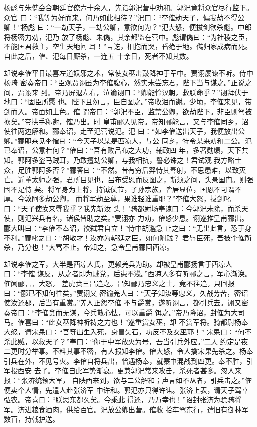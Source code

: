 杨彪与朱儁会合朝廷官僚六十余人，先诣郭汜营中劝和。郭汜竟将众官尽行监下。众官
曰：“我等为好而来，何乃如此相待？”汜曰：“李傕劫天子，偏我劫不得公卿！”杨彪
曰：“一劫天子，一劫公卿，意欲何为？”汜大怒，便拔剑欲杀彪。中郎将杨密力劝，汜乃
放了杨彪、朱儁，其余都监在营中。彪谓儁曰：“为社稷之臣，不能匡君救主，空生天地间
耳！”言讫，相抱而哭，昏绝于地。儁归家成病而死。自此之后，傕、汜每日厮杀，一连五
十余日，死者不知其数。

却说李傕平日最喜左道妖邪之术，常使女巫击鼓降神于军中。贾诩屡谏不听。侍中杨琦
密奏帝曰：“臣观贾诩虽为李傕腹心，然实未尝忘君，陛下当与谋之。”正说之间，贾诩来
到。帝乃屏退左右，泣谕诩曰：“卿能怜汉朝，救朕命乎？”诩拜伏于地曰：“固臣所愿
也。陛下且勿言，臣自图之。”帝收泪而谢。少顷，李傕来见，带剑而入。帝面如土色。傕
谓帝曰：“郭汜不臣，监禁公卿，欲劫陛下。非臣则驾被掳矣。”帝拱手称谢，傕乃出。时
皇甫郦入见帝。帝知郦能言，又与李傕同乡，诏使往两边解和。郦奉诏，走至汜营说汜。汜
曰：“如李傕送出天子，我便放出公卿。”郦即来见李傕曰：“今天子以某是西凉人，与公
同乡，特令某来劝和二公。汜已奉诏，公意若何？”傕曰：“吾有败吕布之大功，辅政四
年，多著勋绩，天下共知。郭阿多盗马贼耳，乃敢擅劫公卿，与我相抗，誓必诛之！君试观
我方略士众，足胜郭阿多否？”郦答曰：“不然。昔有穷后羿恃其善射，不思患难，以致灭
亡。近董太师之强，君所目见也，吕布受恩而反图之，斯须之间，头悬国门。则强固不足恃
矣。将军身为上将，持钺仗节，子孙宗族，皆居显位，国恩不可谓不厚。今敦阿多劫公卿，
而将军劫至尊，果谁轻谁重耶？”李傕大怒，拔剑叱曰：“天子使汝来辱我乎？我先斩汝
头！”骑都尉场奉谏曰：今郭汜未除，而杀天使，则汜兴兵有名，诸侯皆助之矣。”贾诩亦
力劝，傕怒少息。诩遂推皇甫郦出。郦大叫曰：“李傕不奉诏，欲弑君自立！”侍中胡邈急
止之曰：“无出此言，恐于身不利。”郦叱之曰：“胡敬才！汝亦为朝廷之臣，如何附贼？
君辱臣死，吾被李傕所杀，乃分也！”大骂不止。帝知之，急令皇甫郦回西凉。

却说李傕之军，大半是西凉人氏，更赖羌兵为助。却被皇甫郦扬言于西凉人曰：“李傕
谋反，从之者即为贼党，后患不浅。”西凉人多有听郦之言，军心渐涣。傕闻郦言，大怒，
差虎贲王昌追之。昌知郦乃忠义之士，竟不往追，只回报曰：“郦已不知何往矣。”贾诩又
密谕羌人曰：“天子知汝等忠义，久战劳苦，密诏使汝还郡，后当有重赏。”羌人正怨李傕
不与爵赏，遂听诩言，都引兵去。诩又密奏帝曰：“李傕贪而无谋，今兵散心怯，可以重爵
饵之。”帝乃降诏，封傕为大司马。傕喜曰：“此女巫降神祈祷之力也！”遂重赏女巫，却
不赏军将。骑都尉杨奉大怒，谓宋果曰：“吾等出生入死，身冒矢石，功反不及女巫耶！”
宋果曰：“何不杀此贼，以救天子？”奉曰：“你于中军放火为号，吾当引兵外应。”二人
约定是夜二更时分举事。不料其事不密，有人报知李傕。傕大怒，令人擒宋果先杀之。杨奉
引兵在外，不见号火。李傕自将兵出，恰遇杨奉，就寨中混战到四更。奉不胜，引军投西安
去了。李傕自此军势渐衰。更兼郭汜常来攻击，杀死者甚多。忽人来报：“张济统领大军，
自陕西来到，欲与二公解和；声言如不从者，引兵击之。”傕便卖个人情，先遣人赴张济军
中许和。郭汜亦只得许诺。张济上表，请天子驾幸弘农。帝喜曰：“朕思东都久矣。今乘此
得还，乃万幸也！”诏封张济为骠骑将军。济进粮食酒肉，供给百官。汜放公卿出营。傕收
拾车驾东行，遣旧有御林军数百，持戟护送。

